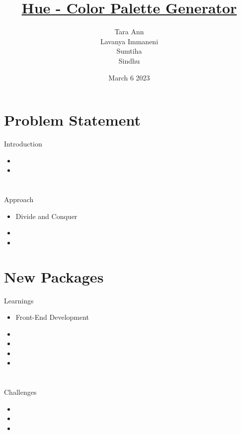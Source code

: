 \documentclass{beamer}
\title{ \underline{Hue - Color Palette Generator}}
\author[Svecw]{Tara Ann  \\ Lavanya Immaneni \\ Sumtiha\\ Sindhu}
\date{March 6 2023}
\begin{document}
\begin{frame}
   \titlepage
\end{frame}

\section{Problem Statement}
\begin{frame}
{\huge Introduction}
\begin{itemize}
    \item 

     \item 




\end{itemize}
\end{frame}

\section{}

\begin{frame}{\huge Approach}

\begin{itemize}
     \item Divide and Conquer
     \item 
     \item 
\end{itemize}

\vskip 1cm

\end{frame}

\section{New Packages}

\begin{frame}{\huge Learnings}

\begin{itemize}
\item Front-End Development

\item 
\item 
\item 
\item 
\end {itemize}

\end{frame}
\section{}
\begin{frame}
{\huge Challenges}
\begin{itemize}
\item 
\item 
\item 
\end{itemize}
\end{frame}
\end{document}

